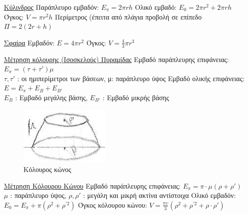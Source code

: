 \documentclass[12pt]{article}
\begin{document}
\begin{flushleft}
	\uline{\textgreek{Κύλινδρος}} \linebreak 
	\textbullet \quad \textgreek{Παράπλευρο εμβαδόν}: $\displaystyle E_\pi = 2\pi rh$ \linebreak  
	\textbullet \quad \textgreek{Ολικό εμβαδό}: $\displaystyle E_0 = 2\pi r^2 +2\pi rh$ \linebreak  
	\textbullet \quad \textgreek{Όγκος}: $\displaystyle V = \pi r^2h$ \linebreak 
	\textbullet \quad \textgreek{Περίμετρος (έπειτα από πλάγια προβολή σε επίπεδο} $ \Pi = 2(2r + h) $ \linebreak 
	
	\uline{\textgreek{Σφαίρα}} \linebreak 
	\textbullet \quad \textgreek{Εμβαδόν}: $\displaystyle E = 4\pi r^2$ \linebreak  
	\textbullet \quad \textgreek{Όγκος}: $\displaystyle V = \frac{4}{3}\pi r^3 $ \linebreak 
	
	\uline{\textgreek{Μέτρηση κόλουρης (Ισοσκελούς) Πυραμίδας}} \linebreak 
	\textbullet \quad \textgreek{Εμβαδό παράπλευρης επιφάνειας}: $\displaystyle E_\pi = (\tau +\tau') \mu $ \\ 
		$\tau, \tau'$  :  \textgreek{οι ημιπερίμετροι των βάσεων, μ: παράπλευρο ύψος} \linebreak 
	\textbullet \quad \textgreek{Εμβαδό ολικής επιφάνειας}: $\displaystyle E = E_\pi + E_B + E_{B'} $ \\ 
		$E_B$  :  \textgreek{Εμβαδό μεγάλης βάσης}, $E_{B'}$  :  \textgreek{Εμβαδό μικρής βάσης} \linebreak 

	\begin{figure}[H]
	\centering
	\includegraphics[scale=3]{coneFrustum}
	\caption{\textgreek{Κόλουρος κώνος}}
	\label{fig:coneFrustum}
	\end{figure}		
	
	\uline{\textgreek{Μέτρηση Κόλουρου Κώνου}} \linebreak 
	\textbullet \quad \textgreek{Εμβαδό παράπλευρης επιφάνειας}: $\displaystyle E_\pi = \pi \cdot \mu (\rho + \rho') $ \\ 
	$\mu$  :  \textgreek{παράπλευρο ύψος}, $\rho, \rho'$  :  \textgreek{μεγάλη και μικρή ακτίνα αντίστοιχα}	\linebreak  
	\textbullet \quad \textgreek{Ολικό εμβαδόν}: $\displaystyle E_0 = E_\pi + \pi(\rho^2 + \rho^{'2})$ \linebreak  
	\textbullet \quad \textgreek{Όγκος κόλουρου κώνου}: $\displaystyle V = \frac{\pi \upsilon}{3} \left( \rho^2 + \rho^{'2} + \rho	\cdot \rho' \right) $ \linebreak 
	

\end{flushleft}
\end{document}
